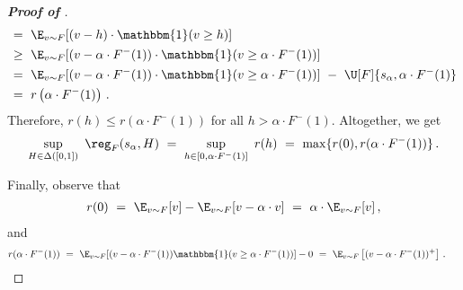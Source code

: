 \begin{proof}[\textbf{Proof of }]
\begin{align*}
        &=\ \E_{v \sim F}[(v - h) \cdot \mathbbm{1}(v \geq h)]\\
        &\geq\ \E_{v \sim F}[(v - \alpha \cdot F^{-}(1)) \cdot \mathbbm{1}(v \geq \alpha \cdot F^{-}(1))]\\
        &= \ \E_{v \sim F}[(v - \alpha \cdot F^{-}(1)) \cdot \mathbbm{1}(v \geq \alpha \cdot F^{-}(1))] \ - \ \U[F]{s_\alpha, \alpha \cdot F^-(1)} \\ 
        &=\ r \left( \alpha \cdot F^{-}(1) \right) \,.
	\end{align*}
	Therefore, $r(h) \leq r(\alpha \cdot F^-(1))$ for all $h > \alpha \cdot F^-(1)$. Altogether, we get
	\begin{align*}
		\sup_{H \in \Delta([0,1])}\ \reg_F(s_\alpha, H)\ =\ \sup_{h \in [0,\alpha \cdot F^-(1)]}\ r(h) \ =\ \max\{  r(0), r(\alpha \cdot F^-(1))\}\,.
	\end{align*}
	
	Finally, observe that
	\begin{align*}
		r(0)\ =\ \E_{v \sim F}[v] - \E_{v \sim F}[v - \alpha \cdot v]\ =\ \alpha \cdot \E_{v \sim F}[v]\,,
	\end{align*}
	and
	\begin{align*}
		r( \alpha \cdot F^-(1))\ =\ \E_{v \sim F}[(v - \alpha \cdot F^-(1)) \mathbbm{1}(v \geq \alpha\cdot F^-(1))] - 0\ =\ \E_{v\sim F}\left[(v - \alpha \cdot F^-(1))^+ \right]\,.\ &\qedhere
	\end{align*}
\end{proof}

